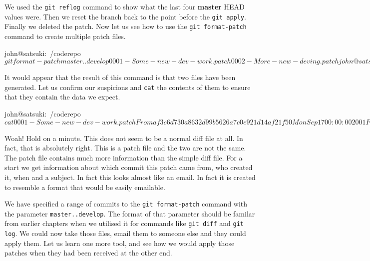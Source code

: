 We used the \texttt{git reflog} command to show what the last four \textbf{master} HEAD values were.
Then we reset the branch back to the point before the \texttt{git apply}.
Finally we deleted the patch.
Now let us see how to use the \texttt{git format-patch} command to create multiple patch files.

\begin{code}
john@satsuki:~/coderepo$ git format-patch master..develop
0001-Some-new-dev-work.patch
0002-More-new-deving.patch
john@satsuki:~/coderepo$
\end{code}

It would appear that the result of this command is that two files have been generated.
Let us confirm our suspicions and \texttt{cat} the contents of them to ensure that they contain the data we expect.

\begin{code}
john@satsuki:~/coderepo$ cat 0001-Some-new-dev-work.patch 
From af3c6d730a8632d99b5626a7c0e921d14af21f50 Mon Sep 17 00:00:00 2001
From: John Haskins <john.haskins@tamagoyakiinc.koala>
Date: Thu, 7 Jul 2011 19:01:59 +0100
Subject: [PATCH 1/2] Some new dev work

---
 newfile3 |    1 +
 1 files changed, 1 insertions(+), 0 deletions(-)

diff --git a/newfile3 b/newfile3
index 638113c..2e00739 100644
--- a/newfile3
+++ b/newfile3
@@ -1 +1,2 @@
 These changes are in the origin
+new dev work
-- 
1.7.4.1

john@satsuki:~/coderepo$
\end{code}

Woah! Hold on a minute. This does not seem to be a normal diff file at all.
In fact, that is absolutely right. This is a patch file and the two are not the same.
The patch file contains much more information than the simple diff file.
For a start we get information about which commit this patch came from, who created it, when and a subject.
In fact this looks almost like an email.  In fact it is created to resemble a format that would be easily emailable.

We have specified a range of commits to the \texttt{git format-patch} command with the parameter \texttt{master..develop}.
The format of that parameter should be familar from earlier chapters when we utilised it for commands like \texttt{git diff} and \texttt{git log}.
We could now take those files, email them to someone else and they could apply them.
Let us learn one more tool, and see how we would apply those patches when they had been received at the other end.


